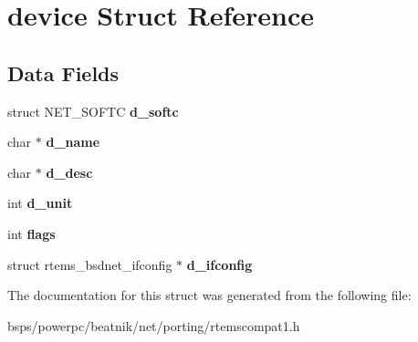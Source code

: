 \hypertarget{structdevice}{}\section{device Struct Reference}
\label{structdevice}
\subsection*{Data Fields}
\begin{DoxyCompactItemize}
\item 
\mbox{\label{structdevice_a2cc634c375ae7e29be4992d531c416ff}} 
struct N\+E\+T\+\_\+\+S\+O\+F\+TC {\bfseries d\+\_\+softc}
\item 
\mbox{\label{structdevice_af1e8f7b7601e6426ae8cfc08b35670a9}} 
char $\ast$ {\bfseries d\+\_\+name}
\item 
\mbox{\label{structdevice_a8aa2eaa74aff408889650f76039fb1a6}} 
char $\ast$ {\bfseries d\+\_\+desc}
\item 
\mbox{\label{structdevice_a5068e19dbb0dbfc52b7c0b512ee698c0}} 
int {\bfseries d\+\_\+unit}
\item 
\mbox{\label{structdevice_acf33716f7e0f8d855f5db1ffc07c715b}} 
int {\bfseries flags}
\item 
\mbox{\label{structdevice_a9127a4a8b05582377a338a21f25cdf87}} 
struct rtems\+\_\+bsdnet\+\_\+ifconfig $\ast$ {\bfseries d\+\_\+ifconfig}
\end{DoxyCompactItemize}


The documentation for this struct was generated from the following file\+:\begin{DoxyCompactItemize}
\item 
bsps/powerpc/beatnik/net/porting/rtemscompat1.\+h\end{DoxyCompactItemize}

